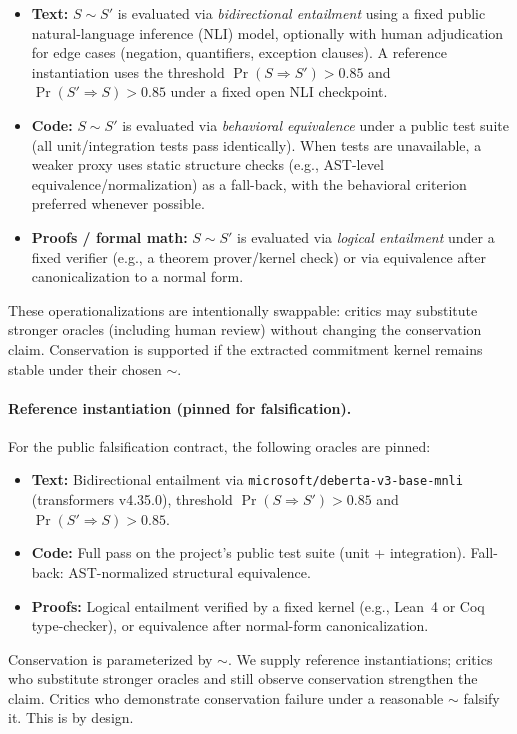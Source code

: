 \documentclass[11pt,a4paper]{article}
\begin{document}
\begin{itemize}
    \item \textbf{Text:} $S \sim S'$ is evaluated via \emph{bidirectional entailment} using a fixed public natural-language inference (NLI) model, optionally with human adjudication for edge cases (negation, quantifiers, exception clauses). A reference instantiation uses the threshold $\Pr(S \Rightarrow S') > 0.85$ and $\Pr(S' \Rightarrow S) > 0.85$ under a fixed open NLI checkpoint.

    \item \textbf{Code:} $S \sim S'$ is evaluated via \emph{behavioral equivalence} under a public test suite (all unit/integration tests pass identically). When tests are unavailable, a weaker proxy uses static structure checks (e.g., AST-level equivalence/normalization) as a fall-back, with the behavioral criterion preferred whenever possible.

    \item \textbf{Proofs / formal math:} $S \sim S'$ is evaluated via \emph{logical entailment} under a fixed verifier (e.g., a theorem prover/kernel check) or via equivalence after canonicalization to a normal form.
\end{itemize}

These operationalizations are intentionally swappable: critics may substitute stronger oracles (including human review) without changing the conservation claim. Conservation is supported if the extracted commitment kernel remains stable under their chosen $\sim$.

\paragraph{Reference instantiation (pinned for falsification).}
For the public falsification contract, the following oracles are pinned:
\begin{itemize}
    \item \textbf{Text:} Bidirectional entailment via \texttt{microsoft/deberta-v3-base-mnli} (transformers v4.35.0), threshold $\Pr(S \Rightarrow S') > 0.85$ and $\Pr(S' \Rightarrow S) > 0.85$.
    \item \textbf{Code:} Full pass on the project's public test suite (unit + integration). Fall-back: AST-normalized structural equivalence.
    \item \textbf{Proofs:} Logical entailment verified by a fixed kernel (e.g., Lean~4 or Coq type-checker), or equivalence after normal-form canonicalization.
\end{itemize}
Conservation is parameterized by $\sim$. We supply reference instantiations; critics who substitute stronger oracles and still observe conservation strengthen the claim. Critics who demonstrate conservation failure under a reasonable $\sim$ falsify it. This is by design.
\end{document}
